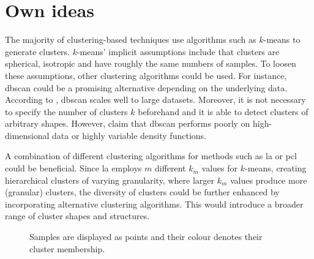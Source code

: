 \section{Own ideas}\label{sec:own_ideas}
\newcommand{\fisher}{Fisher's linear discriminant}

The majority of clustering-based techniques use algorithms such as $k$-means to generate clusters.
$k$-means' implicit assumptions include that clusters are spherical, isotropic and have roughly the same numbers of samples. %
To loosen these assumptions, other clustering algorithms could be used.
For instance, \ac{dbscan} could be a promising alternative depending on the underlying data.
According to \citet{local_aggr_2019}, \ac{dbscan} scales well to large datasets.
Moreover, it is not necessary to specify the number of clusters $k$ beforehand and 
it is able to detect clusters of arbitrary shapes.
However, \citeauthor{local_aggr_2019} claim that \ac{dbscan} performs poorly on 
high-dimensional data or highly variable density functions.

A combination of different clustering algorithms for methods such as 
\ac{la} \citep{local_aggr_2019} or \ac{pcl} \citep{PCL_2021} could be beneficial.
Since \ac{la} employs $m$ different $k_m$ values for $k$-means, 
creating hierarchical clusters of varying granularity, 
where larger $k_m$ values produce more (granular) clusters, 
the diversity of clusters could be further enhanced by incorporating alternative clustering algorithms. 
This would introduce a broader range of cluster shapes and structures.

\begin{figure}[!htb]%
    \centering
    \qquad
    \caption{Samples are displayed as points and their colour denotes their cluster membership.}%
    \label{fig:graph_svm}%
\end{figure}

